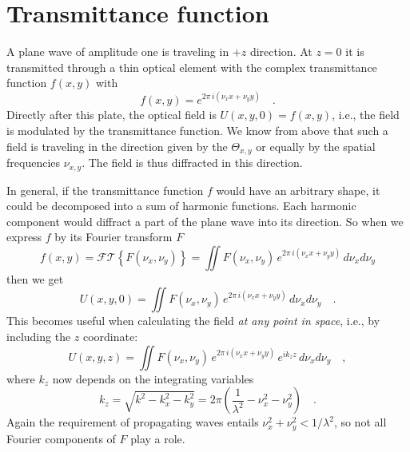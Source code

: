 \section{Transmittance function}

A plane wave of amplitude one is traveling in $+z$ direction. At $z=0$ it is transmitted through a thin optical element with the complex  transmittance function $f(x,y)$ with
\begin{equation}
    f(x,y) =  e^{2 \pi \, i (\nu_x x + \nu_y y) } \quad .
\end{equation}
Directly after this plate, the optical field is $U(x,y,0) = f(x,y)$, i.e., the field is modulated by the transmittance function. We know from above that such a field is traveling in the direction given by the $\Theta_{x,y}$ or equally by the spatial frequencies $\nu_{x,y}$. The field is thus diffracted in this direction.

In general, if the transmittance function $f$ would have an arbitrary shape, it could be decomposed into a sum of harmonic functions. Each harmonic component would diffract a part of the plane wave into its direction. So when we express $f$ by its Fourier transform $F$
\begin{equation}
    f(x,y) = \mathcal{FT} \left\{ F(\nu_x, \nu_y) \right\}
     = \iint F(\nu_x, \nu_y)  \, e^{2 \pi \, i (\nu_x x + \nu_y y) } \, d\nu_x  d\nu_y
\end{equation}
then we get
\begin{equation}
    U(x,y,0) 
     = \iint F(\nu_x, \nu_y)  \, e^{2 \pi \, i (\nu_x x + \nu_y y) } \, d\nu_x  d\nu_y \quad .
\end{equation}
This becomes useful when calculating the field \emph{at any point in space}, i.e., by including the $z$ coordinate:
\begin{equation}
    U(x,y,z) 
     = \iint F(\nu_x, \nu_y)  \, e^{2 \pi \, i (\nu_x x + \nu_y y) } \,e^{i k_z z} \, d\nu_x  d\nu_y \quad ,
     \label{eq:2_Uxyz}
\end{equation}
where $k_z$ now depends on the integrating variables
\begin{equation}
    k_z = \sqrt{k^2 - k_x^2 - k_y^2} = 2 \pi \left( \frac{1}{\lambda^2} - \nu_x^2 - \nu_y^2 \right) \quad .
    \label{eq:2_Uxyz_kz}
\end{equation}
Again the requirement of propagating waves entails $\nu_x^2 + \nu_y^2 <  1/\lambda^2$, so not all Fourier components of $F$ play a role.


